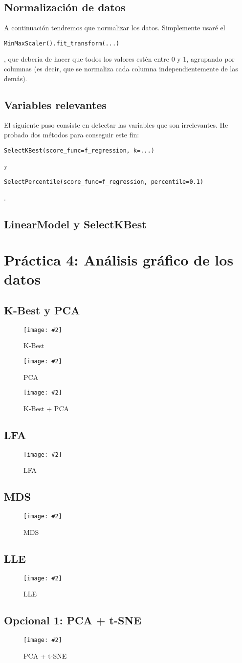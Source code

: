 \documentclass[
12pt, 
spanish, 
singlespacing,
headsepline
]{article}
\newcommand{\image}[2]{
\begin{figure}[H]
	\caption{#1}
	\centering
	\texttt{[image: \#2]}
\end{figure}
}
\newcommand{\code}[1]{\colorbox{light-gray}{\parbox{\dimexpr\linewidth-2\fboxsep}{\strut  \texttt{#1}\strut}}}
\begin{document}
\subsection{Normalización de datos}
A continuación tendremos que normalizar los datos. Simplemente usaré el \code{MinMaxScaler().fit_transform(...)}, que debería de hacer que todos los valores estén entre 0 y 1, agrupando por columnas (es decir, que se normaliza cada columna independientemente de las demás).

\subsection{Variables relevantes}
El siguiente paso consiste en detectar las variables que son irrelevantes. He probado dos métodos para conseguir este fin: \code{SelectKBest(score_func=f_regression, k=...)} y \code{SelectPercentile(score_func=f_regression, percentile=0.1)}.

\subsection{LinearModel y SelectKBest}

\section{Práctica 4: Análisis gráfico de los datos}
\subsection{K-Best y PCA}
\image{K-Best}{pl4/Figure_1.png}
\image{PCA}{pl4/Figure_2.png}
\image{K-Best + PCA}{pl4/Figure_3.png}
\subsection{LFA}
\image{LFA}{pl4/Figure_4.png}
\subsection{MDS}
\image{MDS}{pl4/Figure_5.png}
\subsection{LLE}
\image{LLE}{pl4/Figure_6.png}
\subsection{Opcional 1: PCA + t-SNE}
\image{PCA + t-SNE}{pl4/Figure_7.png}
\end{document}
